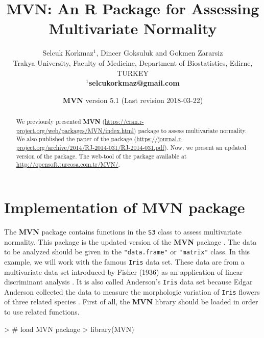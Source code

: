 \documentclass[11pt]{article}
\title{MVN: An R Package for Assessing Multivariate Normality}
\author{Selcuk Korkmaz$^1$, Dincer Goksuluk and Gokmen Zararsiz\\[0.35cm]
\small{Trakya University, Faculty of Medicine, Department of Biostatistics, Edirne, TURKEY}\\[0cm]\textbf{\small{$^1$selcukorkmaz@gmail.com}}
}
\date{\textbf{MVN} version 5.1  (Last revision 2018-03-22)}
\begin{document}


\begin{Schunk}
\end{Schunk}

\maketitle



\begin{abstract}
We previously presented \textbf{MVN} (\url{https://cran.r-project.org/web/packages/MVN/index.html}) package to assess multivariate normality. We also published the paper of the package (\url{https://journal.r-project.org/archive/2014/RJ-2014-031/RJ-2014-031.pdf}). Now, we present an updated version of the package. The web-tool of the package available at \url{http://opensoft.turcosa.com.tr/MVN/}.
\end{abstract}



\section{Implementation of MVN package} \label{sec:mvnRimplement}
The \textbf{MVN} package contains functions in the \texttt{S3} class to assess multivariate normality. This package is the updated version of the \textbf{MVN} package \cite{korkmaz:2014}. The data to be analyzed should be given in the \texttt{"data.frame"} or \texttt{"matrix"} class. In this example, we will work with the famous \texttt{Iris} data set. These data are from a multivariate data set introduced by Fisher (1936) as an application of linear discriminant analysis \cite{fisher:1936}. It is also called Anderson's \texttt{Iris} data set because Edgar Anderson collected the data to measure the morphologic variation of \texttt{Iris} f\mbox{}lowers of three related species \cite{edgarIris:1936}. First of all, the \textbf{MVN} library should be loaded in order to use related functions.


\begin{Schunk}
\begin{Sinput}
> # load MVN package
> library(MVN)
\end{Sinput}
\end{Schunk}
\end{document}
